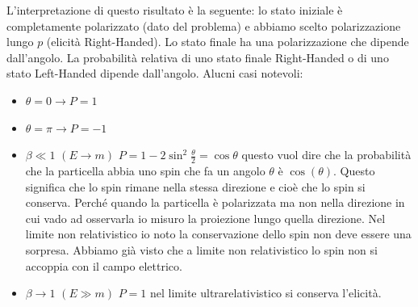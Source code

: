 L'interpretazione di questo risultato è la seguente: lo stato iniziale è completamente polarizzato (dato del problema) e abbiamo scelto polarizzazione lungo $p$ (elicità Right-Handed). Lo stato finale ha una polarizzazione che dipende dall'angolo. La probabilità relativa di uno stato finale Right-Handed o di uno stato Left-Handed dipende dall'angolo. Alucni casi notevoli:
\begin{itemize}
    \item $\theta=0\to P=1$
    \item $\theta=\pi\to P=-1$
    \item $\beta\ll1$ $(E\to m)$ $P=1-2\sin^2{\frac{\theta}{2}}=\cos{\theta}$ questo vuol dire che la probabilità che la particella abbia uno spin che fa un angolo $\theta$ è $\cos(\theta)$. Questo significa che lo spin rimane nella stessa direzione e cioè che lo spin si conserva. Perché quando la particella è polarizzata ma non nella direzione in cui vado ad osservarla io misuro la proiezione lungo quella direzione. Nel limite non relativistico io noto la conservazione dello spin non deve essere una sorpresa. Abbiamo già visto che a limite non relativistico lo spin non si accoppia con il campo elettrico.
    \item $\beta\to 1$ $(E\gg m)$ $P=1$ nel limite ultrarelativistico si conserva l'elicità.
\end{itemize}
